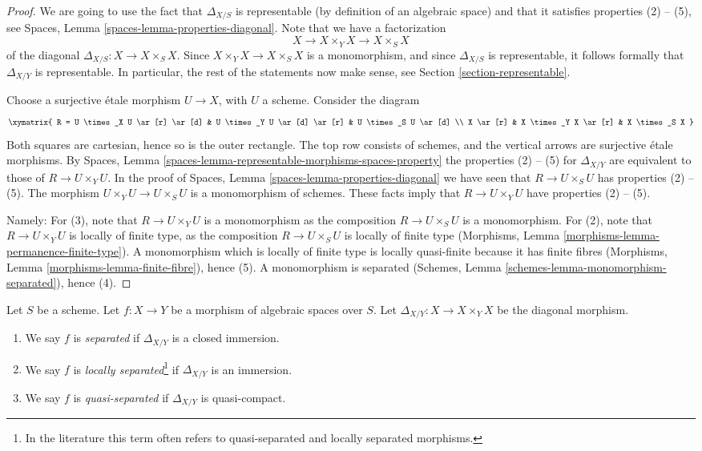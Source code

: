 \begin{proof}
We are going to use the fact that $\Delta_{X/S}$ is
representable (by definition of an algebraic space) and that
it satisfies properties (2) -- (5), see
Spaces, Lemma \ref{spaces-lemma-properties-diagonal}.
Note that we have a factorization
$$
X
\longrightarrow
X \times_Y X
\longrightarrow
X \times_S X
$$
of the diagonal $\Delta_{X/S} : X \to X \times_S X$. Since
$X \times_Y X \to X \times_S X$ is a monomorphism, and since
$\Delta_{X/S}$ is representable, it follows formally that
$\Delta_{X/Y}$ is representable. In particular, the rest of
the statements now make sense, see
Section \ref{section-representable}.

\medskip\noindent
Choose a surjective \'etale morphism $U \to X$, with $U$ a scheme.
Consider the diagram
$$
\xymatrix{
R = U \times_X U \ar[r] \ar[d] &
U \times_Y U \ar[d] \ar[r] &
U \times_S U \ar[d] \\
X \ar[r] & X \times_Y X \ar[r] & X \times_S X
}
$$
Both squares are cartesian, hence so is the outer rectangle.
The top row consists of schemes, and the vertical arrows
are surjective \'etale morphisms. By
Spaces, Lemma \ref{spaces-lemma-representable-morphisms-spaces-property}
the properties (2) -- (5) for $\Delta_{X/Y}$ are equivalent to those of
$R \to U \times_Y U$. In the proof of
Spaces, Lemma \ref{spaces-lemma-properties-diagonal}
we have seen that $R \to U \times_S U$ has properties (2) -- (5).
The morphism $U \times_Y U \to U \times_S U$ is a monomorphism
of schemes. These facts imply that $R \to U \times_Y U$ have
properties (2) -- (5).

\medskip\noindent
Namely: For (3), note that $R \to U \times_Y U$
is a monomorphism as the composition
$R \to U \times_S U$ is a monomorphism. For (2), note that
$R \to U \times_Y U$ is locally of finite type, as the
composition $R \to U \times_S U$ is locally of finite type
(Morphisms, Lemma \ref{morphisms-lemma-permanence-finite-type}).
A monomorphism which is locally of finite type is locally quasi-finite
because it has finite fibres
(Morphisms, Lemma \ref{morphisms-lemma-finite-fibre}), hence (5).
A monomorphism is separated
(Schemes, Lemma \ref{schemes-lemma-monomorphism-separated}), hence (4).
\end{proof}

\begin{definition}
\label{definition-separated}
Let $S$ be a scheme.
Let $f : X \to Y$ be a morphism of algebraic spaces over $S$.
Let $\Delta_{X/Y} : X \to X \times_Y X$ be the diagonal morphism.
\begin{enumerate}
\item We say $f$ is {\it separated} if $\Delta_{X/Y}$ is a closed immersion.
\item We say $f$ is {\it locally separated}\footnote{In the literature
this term often refers to quasi-separated and locally separated morphisms.}
if $\Delta_{X/Y}$ is an immersion.
\item We say $f$ is {\it quasi-separated} if $\Delta_{X/Y}$ is quasi-compact.
\end{enumerate}
\end{definition}

